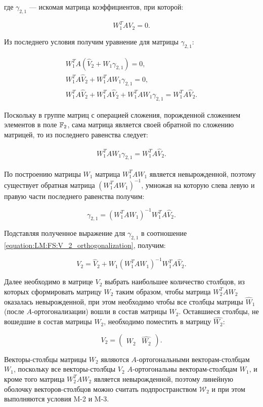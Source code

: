 где $\gamma_{2,1}$ --- искомая матрица коэффициентов, при которой:

$$
	W_1^T A V_2 = 0.
$$

Из последнего условия получим уравнение для матрицы $\gamma_{2,1}$:

$$
	\begin{array}{c}
		W_1^T A ( \widehat{V}_2 + W_1 \gamma_{2,1} ) = 0, \\
		W_1^T A \widehat{V}_2 + W_1^T A W_1 \gamma_{2,1} = 0, \\
		W_1^T A \widehat{V}_2 + W_1^T A \widehat{V}_2 + W_1^T A W_1 \gamma_{2,1} = W_1^T A \widehat{V}_2.
	\end{array}
$$

Поскольку в группе матриц с операцией сложения, порожденной сложением элементов в поле $\mathbb{F}_2$, сама матрица является своей обратной
по сложению матрицей, то из последнего равенства следует:

$$
	\begin{array}{c}
	 	W_1^T A W_1 \gamma_{2,1} = W_1^T A \widehat{V}_2.
	\end{array}
$$

По построению матрицы $W_1$ матрица $W_1^T A W_1$ является невырожденной, поэтому существует обратная матрица
$\left ( W_1^T A W_1 \right ) ^{-1}$, умножая на которую слева левую и правую части последнего равенства получим:

$$
	\gamma_{2,1} = \left ( W_1^T A W_1 \right ) ^ {-1} W_1^T A \widehat{V}_2.
$$

Подставляя полученное выражение для $\gamma_{2,1}$ в соотношение \ref{equation:LM:FS:V_2_orthogonalization}, получим:

$$
	V_2 = \widehat{V}_2 + W_1 \left ( W_1^T A W_1 \right ) ^ {-1} W_1^T A \widehat{V}_2.
$$

Далее необходимо в матрице $V_2$ выбрать наибольшее количество столбцов, из которых сформировать матрицу $W_2$ таким образом, чтобы
матрица $W_2^T A W_2$ оказалась невырожденной, при этом необходимо чтобы все столбцы матрицы $\widehat{W}_1$ (после $A$-ортогонализации)
вошли в состав матрицы $W_2$. Оставшиеся столбцы, не вошедшие в состав матрицы $W_2$, необходимо поместить в матрицу $\widehat{W_2}$:

$$
	V_2 =
		\begin{pmatrix}
			W_2 & \widehat{W_2}
		\end{pmatrix}
	.
$$

Векторы-столбцы матрицы $W_2$ являются $A$-ортогональными векторам-столбцам $W_1$, поскольку все векторы-столбцы $V_2$
$A$-ортогональны векторам-столбцам $W_1$, и кроме того матрица $ W_2^T A W_2 $ является невырожденной, поэтому линейную оболочку
векторов-столбцов можно считать подпространством $\mathcal W_2$ и при этом выполняются условия M-2 и M-3.

